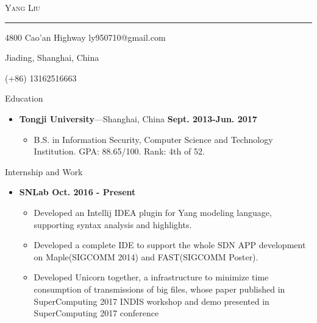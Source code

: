 \documentclass[10pt,oneside]{article}
\newcommand{\bigname}[1]{
	\begin{center}\fontfamily{phv}\selectfont\Huge\scshape#1\end{center}
}
\newenvironment{ressection}[1]{
	\vspace{4pt}
	{\fontfamily{phv}\selectfont\Large#1}
	\begin{itemize}
	\vspace{3pt}
}{
	\end{itemize}
}
\newcommand{\resitem}[1]{
	\vspace{-4pt}
	\item \begin{flushleft} #1 \end{flushleft}
}
\newcommand{\ressubitem}[1]{
	\vspace{-1pt}
	\item \begin{flushleft} #1 \end{flushleft}
}
\newcommand{\resbigitem}[3]{
	\vspace{-5pt}
	\item
	\textbf{#1}---#2 \
	\textit{#3}
}
\newenvironment{ressubsec}[3]{
	\resbigitem{#1}{#2}{#3}
	\vspace{-2pt}
	\begin{itemize}
}{
	\end{itemize}
}
\newenvironment{reslist}[1]{
	\resitem{\textbf{#1}}
	\vspace{-5pt}
	\begin{itemize}
}{
	\end{itemize}
}
\begin{document}
 \selectfont

\bigname{Yang Liu}

\vspace{-8pt} \rule{\textwidth}{1pt}

\vspace{-1pt} {4800 Cao'an Highway \hfill ly950710@gmail.com}

\vspace{-1pt} {Jiading, Shanghai, China}

\vspace{-1pt} {(+86) 13162516663}

\vspace{8 pt}

\newcommand{\textsharp}{$\sharp$}

\begin{ressection}{Education}
	\begin{ressubsec}{Tongji University}{Shanghai, China \hfill \textbf{Sept. 2013-Jun. 2017}}{}
		\ressubitem{B.S. in Information Security, Computer Science and Technology Institution. GPA: 88.65/100. Rank: 4th of 52. }
	\end{ressubsec}
\end{ressection}


\begin{ressection}{Internship and Work}
	\begin{reslist}{SNLab \hfill Oct. 2016 - Present}
		\ressubitem{Developed an Intellij IDEA plugin for Yang modeling language, supporting syntax analysis and highlights.}
        \ressubitem{Developed a complete IDE to support the whole SDN APP development on Maple(SIGCOMM 2014) and FAST(SIGCOMM Poster).}
		\ressubitem{Developed Unicorn together, a infrastructure to minimize time consumption of transmissions of big files, whose paper published in SuperComputing 2017 INDIS workshop and demo presented in SuperComputing 2017 conference}
	\end{reslist}
\end{ressection}
	
\end{document}
